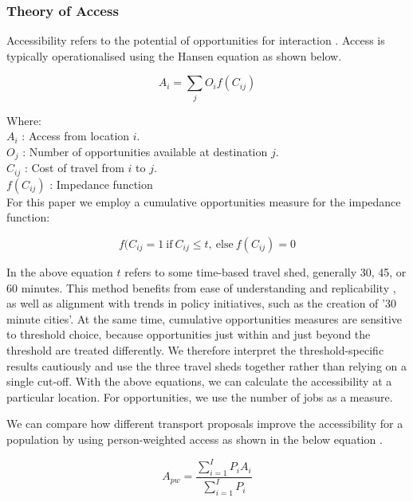 \documentclass[preprint,12pt,authoryear]{elsarticle}
\begin{document}
\subsubsection{Theory of Access}

Accessibility refers to the potential of opportunities for interaction \parencite{Hansen1959,levinson2020b}.  Access is typically operationalised using the Hansen equation as shown below.

\begin{equation} \label{eq:1}
A_{i} = \sum_{j}O_{i}f(C_{ij})
\end{equation}

Where:\\
\(A_{i}\) : Access from location \(i\). \\
\(O_{j}\) : Number of opportunities available at destination \(j\). \\
\(C_{ij}\) : Cost of travel from \(i\) to \(j\). \\
\(f(C_{ij})\) : Impedance function\\

For this paper we employ a cumulative opportunities measure \parencite{levinson2020a} for the impedance function:

\begin{equation} \label{eq:2}
{f(C_{ij} = 1 \:\text{if}\: C_{ij} \leq t}, \: \text{else}     \: {f(C_{ij}) = 0}
\end{equation}

{In the above equation \(t\) refers to some time-based travel shed, generally 30, 45, or 60 minutes. This method benefits from ease of understanding and replicability \parencite{levinson2020a}, {as well as alignment with trends in policy initiatives, such as the creation of  '30 minute cities'.} At the same time, cumulative opportunities measures are sensitive to threshold choice, because opportunities just within and just beyond the threshold are treated differently. We therefore interpret the threshold-specific results cautiously and use the three travel sheds together rather than relying on a single cut-off. }With the above equations, we can calculate the accessibility at a particular location. For opportunities, we use the number of jobs as a measure.  

We can compare how different transport proposals improve the accessibility for a population by using person-weighted access as shown in the below equation \parencite{levinson2020a}. 

\begin{equation} \label{eq:3}
A_{pw} = \frac{\sum\limits_{i=1}^{I}P_{i}A_{i}}{\sum\limits_{i=1}^{I}P_{i}}
\end{equation}
\end{document}
